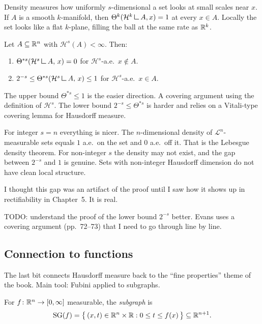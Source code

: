 Density measures how uniformly $s$-dimensional a set looks at small
scales near $x$. If $A$ is a smooth $k$-manifold, then
$\Theta^k(\mathcal{H}^k \mres A, x) = 1$ at every $x \in A$. Locally
the set looks like a flat $k$-plane, filling the ball at the same rate as
$\mathbb{R}^k$.

\begin{theorem}\label{thm:density-bounds}
Let $A \subseteq \mathbb{R}^n$ with $\mathcal{H}^s(A) < \infty$. Then:
\begin{enumerate}[nosep]
  \item $\Theta^{*s}(\mathcal{H}^s \mres A,\, x) = 0$ for
        $\mathcal{H}^s$-a.e.\ $x \notin A$.
  \item $2^{-s} \le \Theta^{*s}(\mathcal{H}^s \mres A,\, x) \le 1$ for
        $\mathcal{H}^s$-a.e.\ $x \in A$.
\end{enumerate}
\end{theorem}

The upper bound $\Theta^{*s} \le 1$ is the easier direction. A covering argument using the definition of $\mathcal{H}^s$.
The lower bound $2^{-s} \le \Theta^{*s}$ is harder and relies on a
Vitali-type covering lemma for Hausdorff measure.

\begin{remark}\label{rem:density-integer}
For integer $s = n$ everything is nicer. The $n$-dimensional density of
$\mathcal{L}^n$-measurable sets equals $1$ a.e.\ on the set and $0$
a.e.\ off it. That is the Lebesgue density theorem. For non-integer $s$
the density may not exist, and the gap between $2^{-s}$ and $1$ is
genuine. Sets with non-integer Hausdorff dimension do not have clean local
structure.

I thought this gap was an artifact of the proof until I saw how it shows up in
rectifiability in Chapter~5. It is real.
\end{remark}

TODO: understand the proof of the lower bound $2^{-s}$ better. Evans uses
a covering argument (pp.\ 72--73) that I need to go through line by line.


\subsection{Connection to functions}\label{subsec:functions}

The last bit connects Hausdorff measure back to the ``fine properties''
theme of the book. Main tool: Fubini applied to subgraphs.

\begin{definition}[Subgraph]\label{def:subgraph}
For $f \colon \mathbb{R}^n \to [0, \infty]$ measurable, the \emph{subgraph} is
\[
  \operatorname{SG}(f) = \bigl\{\, (x, t) \in \mathbb{R}^n \times \mathbb{R} :
    0 \le t \le f(x) \,\bigr\} \subseteq \mathbb{R}^{n+1}.
\]
\end{definition}

